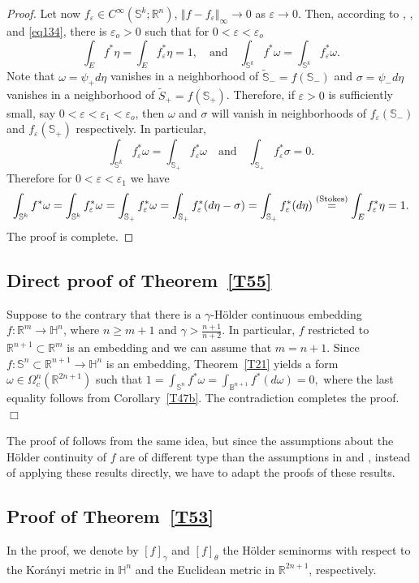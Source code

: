 \documentclass[intlimits,12pt,reqno]{amsart}
\newcommand{\Sph}{\mathbb S}
\newcommand{\bbbb}{\mathbb B}
\newcommand{\bbbh}{\mathbb H}
\newcommand{\R}{\mathbb R}
\newcommand{\eps}{\varepsilon}
\numberwithin{equation}{section}
\theoremstyle{definition}
\begin{document}
\begin{proof}
Let now $f_\eps\in C^\infty(\Sph^k;\R^n)$, $\Vert f-f_\eps\Vert_\infty\to 0$ as $\eps\to 0$. Then, according to , , and \eqref{eq134}, there is $\eps_o>0$ such that for $0<\eps<\eps_o$
$$
\int_E f^*\eta=\int_E f^*_\eps\eta=1,
\quad
\text{and}
\quad
\int_{\Sph^k} f^*\omega=\int_{\Sph^k} f^*_\eps\omega.
$$
Note that $\omega=\psi_+d\eta$ vanishes in a neighborhood of $\tilde{\Sph}_-=f(\Sph_-)$ and $\sigma =\psi_-d\eta$ vanishes in a neighborhood of $\tilde{S}_+=f(\Sph_+)$.
Therefore, if $\eps>0$ is sufficiently small, say $0<\eps<\eps_1<\eps_o$, then $\omega$ and $\sigma$ will vanish in neighborhoods of $f_\eps(\Sph_-)$ and $f_\eps(\Sph_+)$ respectively. In particular,
$$
\int_{\Sph^k} f_\eps^*\omega=\int_{\Sph_+} f_\eps^*\omega
\quad
\text{and}
\quad
\int_{\Sph_+} f_\eps^*\sigma=0.
$$
Therefore for $0<\eps<\eps_1$ we have
$$
\int_{\Sph^k} f^*\omega=\int_{\Sph^k}f_\eps^*\omega=\int_{\Sph_+} f_\eps^*\omega=
\int_{\Sph_+} f_\eps^*(d\eta-\sigma)=\int_{\Sph_+} f_\eps^*(d\eta)
\stackrel{\text{\scriptsize{(Stokes)}}}{=}
\int_E f^*_\eps\eta=1.
$$
The proof is complete.
\end{proof}

\subsection{Direct proof of  Theorem~\ref{T55}}
\label{GroPr}
Suppose to the contrary that there is a $\gamma$-H\"older continuous embedding $f:\R^m\to\bbbh^n$, where $n\geq m+1$ and $\gamma>\frac{n+1}{n+2}$. In particular, $f$ restricted to $\R^{n+1}\subset\R^m$ is an embedding and we can assume that $m=n+1$.
Since $f:\Sph^n\subset\R^{n+1}\to\bbbh^n$ is an embedding, Theorem~\ref{T21} yields a form $\omega\in \Omega^n_c(\R^{2n+1})$ such that
$
1=\int_{\Sph^n} f^*\omega=\int_{\bbbb^{n+1}} f^*(d\omega)=0,
$
where the last equality follows from Corollary~\ref{T47b}.
The contradiction completes the proof. 
\hfill$\Box$

The proof of  follows from the same idea, but since the assumptions about the H\"older continuity of $f$ are of different type than the assumptions in  and , instead of applying these results directly, we have to adapt the proofs of these results. 


\subsection{Proof of Theorem~\ref{T53}}
\label{ProofNonEmb}
In the proof, we denote by $[f]_\gamma$ and $[f]_\theta$ the H\"older seminorms with respect to the Kor\'anyi metric in $\bbbh^n$ and the Euclidean metric in $\R^{2n+1}$, respectively.
\end{document}
